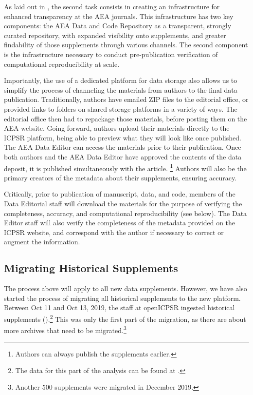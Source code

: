 \documentclass[PP]{AEA}
\newcommand{\aeadcr}{AEA Data and Code Repository}
\begin{document}
As laid out in \citet{10.1257/pandp.108.745}, the second task consists in creating an infrastructure for enhanced transparency at the AEA journals. This infrastructure has two key components: the \aeadcr{} as a transparent, strongly curated repository, with expanded visibility onto supplements, and greater findability of those supplements through various channels. The second component is the infrastructure necessary to conduct pre-publication verification of computational reproducibility at scale.








Importantly, the use of a dedicated platform for data storage also allows us to simplify the process of channeling  the materials from authors to the final data publication. Traditionally, authors have  emailed ZIP files to the editorial office, or provided links to folders on shared storage platforms in a variety of ways. The editorial office then had to repackage those materials, before posting them on the AEA website. Going forward, authors  upload their materials directly to the ICPSR platform, being able to preview what they will look like once published. The AEA Data Editor can access the materials prior to their publication. Once both authors and the AEA Data Editor have approved the contents of the data deposit, it is published simultaneously with the article.%
\footnote{Authors can always publish the supplements earlier.} Authors will also be the primary creators of the metadata about their supplements, ensuring accuracy.

Critically, prior to publication of manuscript, data, and code,  members of the Data Editorial staff will download the materials for the purpose of verifying the completeness, accuracy, and computational reproducibility (see below). The Data Editor staff will also verify the completeness of the metadata provided on the ICPSR website, and correspond with the author if necessary to correct or augment the information. 

\subsection{Migrating Historical Supplements}
\label{sec:migration}

The process above will apply to all new data supplements. However, we have also started the process of migrating all historical supplements to the new platform. Between Oct 11 and Oct 13, 2019, the staff at openICPSR ingested \numsupplements{} historical supplements (\numsizeMB{}).\footnote{The data for this part of the analysis can be found at \citet{E117873V1}.} This was only the first part of the migration, as there are about \remaining{} more archives that need to be migrated.\footnote{Another 500 supplements were migrated in December 2019.}
\end{document}

